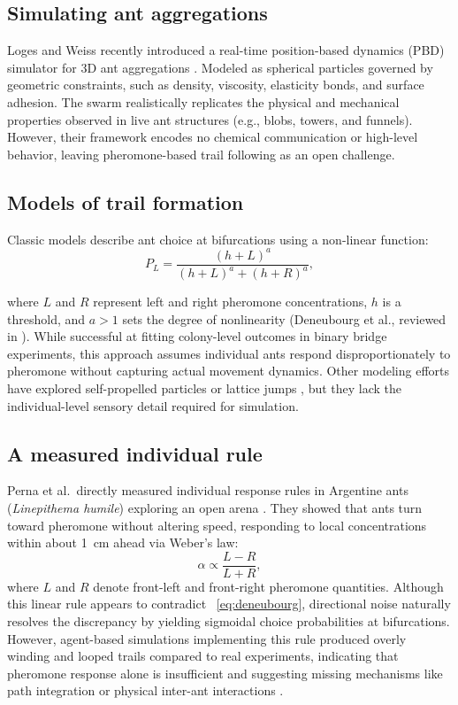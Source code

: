 \documentclass[9pt,twoside]{pnas-new}
\begin{document}
\subsection{Simulating ant aggregations}
Loges and Weiss recently introduced a real-time position-based dynamics (PBD) simulator for 3D ant aggregations \cite{loges2025}. Modeled as spherical particles governed by geometric constraints, such as density, viscosity, elasticity bonds, and surface adhesion. The swarm realistically replicates the physical and mechanical properties observed in live ant structures (e.g., blobs, towers, and funnels). However, their framework encodes no chemical communication or high-level behavior, leaving pheromone-based trail following as an open challenge.

\subsection{Models of trail formation}
Classic models describe ant choice at bifurcations using a non-linear function:
\begin{equation}
P_L = \frac{(h+L)^a}{(h+L)^a + (h+R)^a},
\label{eq:deneubourg}
\end{equation}


where $L$ and $R$ represent left and right pheromone concentrations, $h$ is a threshold, and $a>1$ sets the degree of nonlinearity (Deneubourg et al., reviewed in \cite{perna2012}). While successful at fitting colony-level outcomes in binary bridge experiments, this approach assumes individual ants respond disproportionately to pheromone without capturing actual movement dynamics. Other modeling efforts have explored self-propelled particles or lattice jumps \cite{boissard2013, hartman2024}, but they lack the individual-level sensory detail required for simulation. \Endparasplit

\subsection{A measured individual rule}
Perna et al.\ directly measured individual response rules in Argentine ants (\textit{Linepithema humile}) exploring an open arena \cite{perna2012}. They showed that ants turn toward pheromone without altering speed, responding to local concentrations within about 1~cm ahead via Weber's law:
\begin{equation}
\alpha \propto \frac{L-R}{L+R},
\label{eq:weber}
\end{equation}
where $L$ and $R$ denote front-left and front-right pheromone quantities. Although this linear rule appears to contradict ~\eqref{eq:deneubourg}, directional noise naturally resolves the discrepancy by yielding sigmoidal choice probabilities at bifurcations. However, agent-based simulations implementing this rule produced overly winding and looped trails compared to real experiments, indicating that pheromone response alone is insufficient and suggesting missing mechanisms like path integration \cite{perna2012} or physical inter-ant interactions \cite{dobramysl2025}.
\end{document}
